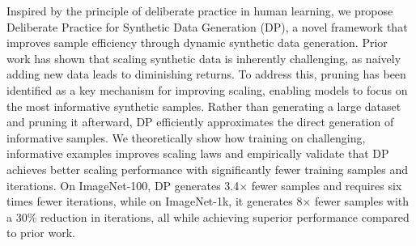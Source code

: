 Inspired by the principle of deliberate practice in human learning, we propose Deliberate Practice for Synthetic Data Generation (DP), a novel framework that improves sample efficiency through dynamic synthetic data generation. Prior work has shown that scaling synthetic data is inherently challenging, as naively adding new data leads to diminishing returns. To address this, pruning has been identified as a key mechanism for improving scaling, enabling models to focus on the most informative synthetic samples. Rather than generating a large dataset and pruning it afterward, DP efficiently approximates the direct generation of informative samples. We theoretically show how training on challenging, informative examples improves scaling laws and empirically validate that DP achieves better scaling performance with significantly fewer training samples and iterations. On ImageNet-100, DP generates 3.4$\times$ fewer samples and requires six times fewer iterations, while on ImageNet-1k, it generates 8$\times$ fewer samples with a 30$\%$ reduction in iterations, all while achieving superior performance compared to prior work.